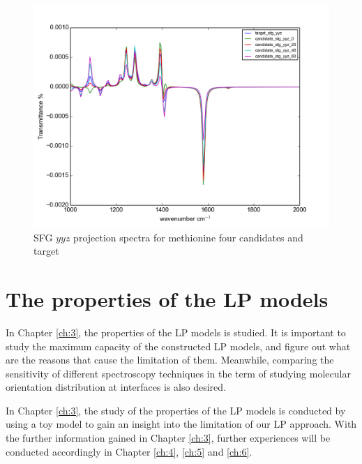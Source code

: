 \begin{figure}[!ht]
\centering
\includegraphics[scale=0.5]{Figures/Met_candidates_plotting_sfg_yyz.png}
\caption{SFG $yyz$ projection spectra for methionine four candidates and target} \label{fig:2.5}
\end{figure}

\section{The properties of the LP models}

In Chapter \ref{ch:3}, the properties of the LP models is studied. It is important to study the maximum capacity of the constructed LP models, and figure out what are the reasons that cause the limitation of them. Meanwhile, comparing the sensitivity of different spectroscopy techniques in the term of studying molecular orientation distribution at interfaces is also desired.

 In Chapter \ref{ch:3}, the study of the properties of the LP models is conducted by using a toy model to gain an insight into the limitation of our LP approach. With the further information gained in Chapter \ref{ch:3}, further experiences will be conducted accordingly in Chapter \ref{ch:4}, \ref{ch:5} and \ref{ch:6}.

